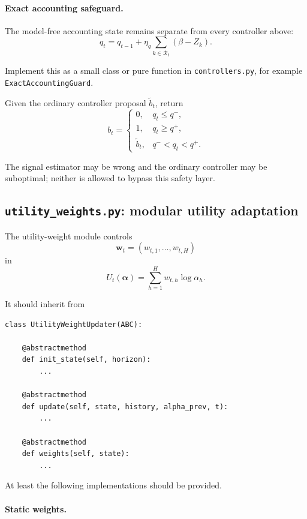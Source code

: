 \documentclass[11pt]{article}
\begin{document}
\paragraph{Exact accounting safeguard.}

The model-free accounting state remains separate from every controller above:
\[
    q_t
    =
    q_{t-1}
    +
    \eta_q
    \sum_{k\in\mathcal R_t}
    (\beta-Z_k).
\]

Implement this as a small class or pure function in
\texttt{controllers.py}, for example
\texttt{ExactAccountingGuard}.

Given the ordinary controller proposal $\widetilde b_t$, return
\[
\boxed{
    b_t
    =
    \begin{cases}
        0,
        & q_t\le q^-,
        \\[1mm]
        1,
        & q_t\ge q^+,
        \\[1mm]
        \widetilde b_t,
        & q^-<q_t<q^+.
    \end{cases}
}
\]

The signal estimator may be wrong and the ordinary controller may be
suboptimal; neither is allowed to bypass this safety layer.

\subsection{\texttt{utility\_weights.py}: modular utility adaptation}
\label{app:weight-module}

The utility-weight module controls
\[
    \bm w_t
    =
    (w_{t,1},\ldots,w_{t,H})
\]
in
\[
    U_t(\bm\alpha)
    =
    \sum_{h=1}^{H}
    w_{t,h}\log\alpha_h.
\]

It should inherit from

\begin{verbatim}
class UtilityWeightUpdater(ABC):

    @abstractmethod
    def init_state(self, horizon):
        ...

    @abstractmethod
    def update(self, state, history, alpha_prev, t):
        ...

    @abstractmethod
    def weights(self, state):
        ...
\end{verbatim}

At least the following implementations should be provided.

\paragraph{Static weights.}
\end{document}
